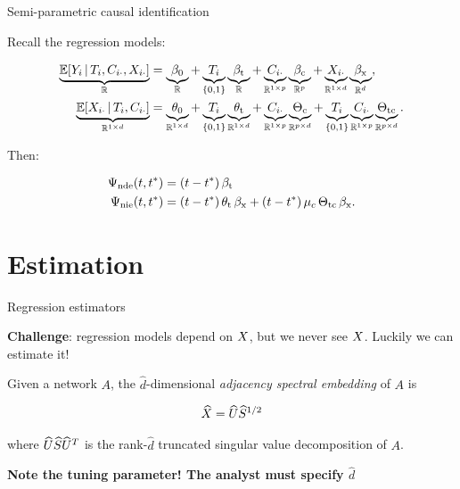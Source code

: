 \documentclass{beamer}
\theoremstyle{remark}
\begin{document}
\begin{frame}{Semi-parametric causal identification}

    Recall the regression models:

    \begin{equation*}
        \begin{aligned}
            \underbrace{\E[T_i, \C_{i \cdot}, \X_{i \cdot}]{Y_i}}_{\R}
             & = \underbrace{\betazero}_{\R}
            + \underbrace{T_i}_{\{0, 1\}} \underbrace{\betat}_{\R}
            + \underbrace{\C_{i \cdot}}_{\R^{1 \times p}} \underbrace{\betac}_{\R^{p}}
            + \underbrace{\X_{i \cdot}}_{\R^{1 \times d}} \underbrace{\betax}_{\R^d}, \\
            \underbrace{\E[T_i, \C_{i \cdot}]{\X_{i \cdot}}}_{\R^{1 \times d}}
             & = \underbrace{\thetazero}_{\R^{1 \times d}}
            + \underbrace{T_i}_{\{0, 1\}} \underbrace{\thetat}_{\R^{1 \times d}}
            + \underbrace{\C_{i \cdot}}_{\R^{1 \times p}} \underbrace{\Thetac}_{\R^{p \times d}}
            + \underbrace{T_i}_{\{0, 1\}} \underbrace{\C_{i \cdot}}_{\R^{1 \times p}} \underbrace{\Thetatc}_{\R^{p \times d}}.
        \end{aligned}
    \end{equation*}

    Then:

    \begin{align*}
        \ndef & = \paren*{t - t^*} \, \betat                                                        \\
        \nief & = \paren*{t - t^*} \, \thetat \, \betax + (t - t^*) \, \mu_c \, \Thetatc \, \betax.
    \end{align*}

\end{frame}

\section{Estimation}

\begin{frame}{Regression estimators}

    \textbf{Challenge}: regression models depend on $X$, but we never see $X$. Luckily we can estimate it!

    \begin{definition}[ASE]

        Given a network $A$, the $\widehat{d}$-dimensional \emph{adjacency spectral embedding} of $A$ is

        \begin{align*}
            \widehat{X} = \widehat{U} \widehat{S}^{1/2}
        \end{align*}

        \noindent where $\widehat{U} \widehat{S} \widehat{U}^T$ is the rank-$\widehat{d}$ truncated singular value decomposition of $A$.

    \end{definition}

    \textbf{Note the tuning parameter! The analyst must specify $\widehat{d}$}

\end{frame}
\end{document}
